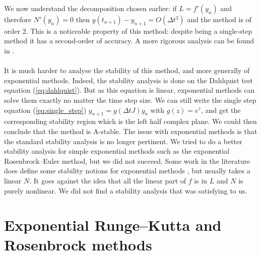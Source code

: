       We now understand the decomposition chosen earlier: if $L = f'\left(y_n\right)$ and therefore $N'\left(y_n\right) = 0$ then $y\left(t_{n+1}\right) - y_{n+1} = O\left(\Delta t^3\right)$ and the method is of order 2.
      This is a noticeable property of this method: despite being a single-step method it has a second-order of accuracy.
      A more rigorous analysis can be found in \cite{HochbruckOstermannSchweitzer2009}.

      \paragraph{}
      It is much harder to analyse the stability of this method, and more generally of exponential methods.
      Indeed, the stability analysis is done on the Dahlquist test equation (\ref{eq:dahlquist}).
      But as this equation is linear, exponential methods can solve them exactly no matter the time step size.
      We can still write the single step equation (\ref{eq:single_step}) $y_{n+1} = g\left(\Delta tJ\right)y_n$ with $g\left(z\right) = e^z$, and get the corresponding stability region which is the left half complex plane.
      We could then conclude that the method is A-stable.
      The issue with exponential methods is that the standard stability analysis is no longer pertinent.
      We tried to do a better stability analysis for simple exponential methods such as the exponential Rosenbrock--Euler method, but we did not succeed.
      Some work in the literature does define some stability notions for exponential methods \cite{DuZhu2004}, but usually takes a linear $N$.
      It goes against the idea that all the linear part of $f$ is in $L$ and $N$ is purely nonlinear.
      We did not find a stability analysis that was satisfying to us.


  \section{Exponential Runge--Kutta and Rosenbrock methods}

